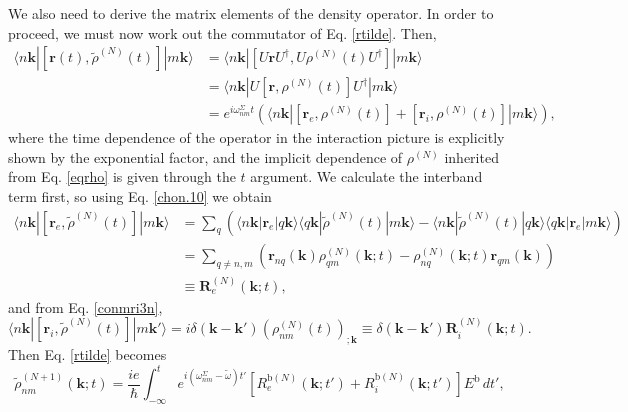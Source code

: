 We also need to derive the matrix elements of the density operator. In order to
proceed, we must now work out the commutator of Eq. \eqref{rtilde}. Then,
\begin{align}\label{conmu1}
\langle n\mathbf{k}|
\left[\mathbf{r}(t),\tilde{\rho}^{(N)}(t)\right]
|m\mathbf{k}\rangle
&= \langle n\mathbf{k}|
\left[U\mathbf{r}U^\dagger,U\rho^{(N)}(t)U^\dagger\right]
|m\mathbf{k}\rangle\nonumber \\
&= \langle n\mathbf{k}|
U\left[\mathbf{r},\rho^{(N)}(t)\right]U^\dagger
|m\mathbf{k}\rangle\\
&= e^{i\omega^\Sigma_{nm}t}
\left(
\langle n\mathbf{k}|
  \left[\mathbf{r}_{e},\rho^{(N)}(t)\right]
+ \left[\mathbf{r}_{i},\rho^{(N)}(t)\right]
|m\mathbf{k}\rangle
\right)\nonumber,
\end{align}
where the time dependence of the operator in the interaction picture is
explicitly shown by the exponential factor, and the implicit dependence of
$\rho^{(N)}$ inherited from Eq. \eqref{eqrho} is given through the $t$ argument.
We calculate the interband term first, so using Eq. \eqref{chon.10} we obtain
\begin{align}\label{conmu2}
\langle n\mathbf{k}|
\left[\mathbf{r}_{e},\tilde{\rho}^{(N)}(t)\right]
|m\mathbf{k}\rangle
&= \sum_{q}
\left(
  \langle n\mathbf{k}| \mathbf{r}_{e} |q\mathbf{k}\rangle
  \langle q\mathbf{k}| \tilde{\rho}^{(N)}(t) |m\mathbf{k}\rangle
- \langle n\mathbf{k}| \tilde{\rho}^{(N)}(t) |q\mathbf{k}\rangle
  \langle q\mathbf{k}| \mathbf{r}_{e} |m\mathbf{k}\rangle
\right)\nonumber \\
&= \sum_{q\ne n,m}
\left(
  \mathbf{r}_{nq}(\mathbf{k})
  \rho^{(N)}_{q m}(\mathbf{k};t)
- \rho^{(N)}_{nq}(\mathbf{k};t)
  \mathbf{r}_{q m}(\mathbf{k})
\right)\nonumber\\
& \equiv \mathbf{R}^{(N)}_{e}(\mathbf{k};t),
\end{align}
and from Eq. \eqref{conmri3n},
\begin{equation}\label{conmri4}
\langle n\mathbf{k}|
[\mathbf{r}_i,\tilde{\rho}^{(N)}(t)]
|m\mathbf{k}'\rangle
=i \delta(\mathbf{k}-\mathbf{k}') (\rho^{(N)}_{nm}(t))_{;\mathbf{k}}
\equiv \delta(\mathbf{k}-\mathbf{k}')\mathbf{R}_i^{(N)}(\mathbf{k};t).
\end{equation}
Then Eq. \eqref{rtilde} becomes
\begin{equation}\label{rtilde2}
\tilde{\rho}^{(N+1)}_{nm}(\mathbf{k};t)
= \frac{ie}{\hbar}\int_{-\infty}^{t}
e^{i(\omega^{\Sigma}_{nm} - \tilde{\omega})t'}
\left[
  R_{e}^{\mathrm{b}(N)}(\mathbf{k};t')
+ R_{i}^{\mathrm{b}(N)}(\mathbf{k};t')
\right]
E^{\mathrm{b}}\,dt',
\end{equation}
